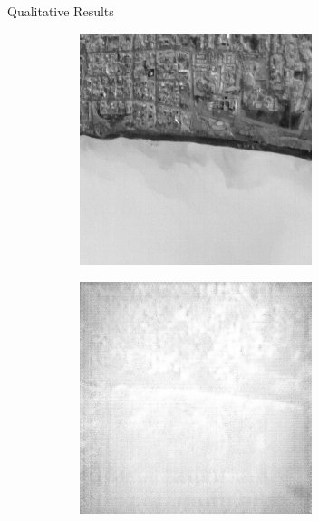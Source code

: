 \documentclass[final]{beamer}
\newlength{\colwidth}
\begin{document}
\begin{frame}[t]
\begin{columns}[t]
\begin{column}{\colwidth}
\begin{block}{Qualitative Results}
\begin{figure}
        \centering
        \begin{subfigure}[b]{0.19\textwidth}
            \centering
            \includegraphics[width=\textwidth]{../figs/outputs/pan/28.png}
            \label{fig:pan}
        \end{subfigure}
        \hfill
        \begin{subfigure}[b]{0.19\textwidth}
            \centering
            \includegraphics[width=\textwidth]{../figs/outputs/cycleGan/28.png}

\end{subfigure}
\end{figure}
\end{block}
\end{column}
\end{columns}
\end{frame}
\end{document}
